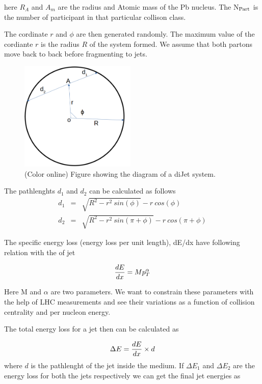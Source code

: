 \documentclass[reprint,amsmath,amssymb,aps,showpacs,showkeys]{revtex4}
\begin{document}
here $R_{A}$ and $A_{m}$ are the radius and Atomic mass of the Pb nucleus. The
N$_{\rm Part}$ is the number of participant in that particular collison class.

The cordinate $r$ and $\phi$ are then generated randomly. The maximum value of the
cordiante $r$ is the radius $R$ of the system formed. We assume that both partons
move back to back before fragmenting to jets. 


\begin{figure}
  \includegraphics[width=0.49\textwidth]{Figures/DiJetDia.pdf}
  \caption{(Color online) Figure showing the diagram of a diJet system.}
  \label{Fig:DiJetDiagram}
\end{figure}

The pathlenghts $d_{1}$ and $d_{2}$ can be calculated as follows
\begin{eqnarray}
  d_{1} &= &\sqrt{R^{2}-r^{2}~sin(\phi)} - r~cos(\phi) \nonumber \\  
  d_{2} &= &\sqrt{R^{2}-r^{2}~sin(\pi+\phi)} - r~cos(\pi+\phi)  
\end{eqnarray}

The specific energy loss (energy loss per unit length), dE/dx have following
relation with the \pt of jet

\begin{equation}
  \frac{dE}{dx} = M p_{T}^{\alpha}\\
\end{equation}

Here M and $\alpha$ are two parameters. We want to constrain these parameters with the
help of LHC measurements and see their variations as a function of collision centrality
and per nucleon energy.

The total energy loss for a jet then can be calculated as

\begin{equation}
  \Delta E = \frac{dE}{dx} \times d \\
\end{equation}
 where $d$ is the pathlenght of the jet inside the medium.
 If $\Delta E_1$ and $\Delta E_2$ are the energy loss for both the jets
 respectively we can get the final jet energies as
\end{document}
